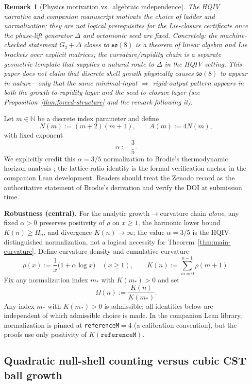 \documentclass[11pt]{amsart}
\newtheorem{remark}[theorem]{Remark}
\begin{document}
\begin{remark}[Physics motivation vs.\ algebraic independence]
The HQIV narrative and companion manuscript motivate the \emph{choice} of ladder and normalization; they are not logical prerequisites for the Lie-closure certificate once the phase-lift generator \(\Delta\) and octonionic seed are fixed. Concretely: the machine-checked statement \(G_2+\Delta\) closes to \(\mathfrak{so}(8)\) is a theorem of linear algebra and Lie brackets over explicit matrices; the curvature/rapidity chain is a separate geometric template that supplies a natural route to \(\Delta\) in the HQIV setting. This paper does \emph{not} claim that discrete shell growth physically \emph{causes} \(\mathfrak{so}(8)\) to appear in nature---only that the same minimal-input \(\Rightarrow\) rigid-output pattern appears in both the growth-to-rapidity layer and the seed-to-closure layer (see Proposition~\ref{thm:forced-structure} and the remark following it).
\end{remark}

Let $m\in\mathbb N$ be a discrete index parameter and define
\[
N(m):=(m+2)(m+1),\qquad A(m):=4N(m),
\]
with fixed exponent
\[
\alpha:=\frac35.
\]
We explicitly credit this \(\alpha=3/5\) normalization to Brodie's thermodynamic horizon analysis \cite{brodie2026}; the lattice-ratio identity is the formal verification anchor in the companion Lean development.
Readers should treat the Zenodo record as the authoritative statement of Brodie's derivation and verify the DOI at submission time.

\medskip
\noindent\textbf{Robustness (central).} For the analytic growth\(\to\)curvature chain \emph{alone}, any fixed \(\alpha>0\) preserves positivity of \(\rho\) on \(x\ge 1\), the harmonic lower bound \(K(n)\ge H_n\), and divergence \(K(n)\to\infty\); the value \(\alpha=3/5\) is the HQIV-distinguished normalization, not a logical necessity for Theorem~\ref{thm:main-curvature}.
Define curvature density and cumulative curvature
\[
\rho(x):=\frac1x\bigl(1+\alpha\log x\bigr)\quad (x\ge 1),\qquad
K(n):=\sum_{m=0}^{n-1}\rho(m+1).
\]
Fix any normalization index $m_\ast$ with $K(m_\ast)>0$ and set
\[
\Omega(n):=\frac{K(n)}{K(m_\ast)}.
\]
Any index \(m_\ast\) with \(K(m_\ast)>0\) is admissible; all identities below are independent of which admissible choice is made. In the companion Lean library, normalization is pinned at \texttt{referenceM}\(=4\) (a calibration convention), but the proofs use only positivity of \(K(\texttt{referenceM})\).

\subsection*{Quadratic null-shell counting versus cubic CST ball growth}
\end{document}
